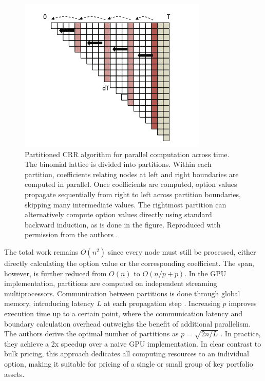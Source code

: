 \documentclass[english,12pt,a4paper,pdftex,sci,utf8]{aaltothesis}
\begin{document}
\begin{figure}[h]
    \centering
    \includegraphics[scale=0.6]{External Images/CRRpartitioned.png}
    \caption{Partitioned CRR algorithm for parallel computation across time. The binomial lattice is divided into partitions. Within each partition, coefficients relating nodes at left and right boundaries are computed in parallel. Once coefficients are computed, option values propagate sequentially from right to left across partition boundaries, skipping many intermediate values. The rightmost partition can alternatively compute option values directly using standard backward induction, as is done in the figure. Reproduced with permission from the authors \cite{ganesan2009acceleration}.}

    \label{fig:partitioned}
\end{figure}

The total work remains $O(n^2)$ since every node must still be processed, either directly calculating the option value or the corresponding coefficient. The span, however, is further reduced from $O(n)$ to $O(n/p + p)$. In the GPU implementation, partitions are computed on independent streaming multiprocessors. Communication between partitions is done through global memory, introducing latency $L$ at each propagation step \cite{ganesan2009acceleration}. Increasing $p$ improves execution time up to a certain point, where the communication latency and boundary calculation overhead outweighs the benefit of additional parallelism. The authors derive the optimal number of partitions as $p = \sqrt{2n/L}$ \cite{ganesan2009acceleration}. In practice, they achieve a 2x speedup over a naive GPU implementation. In clear contrast to bulk pricing, this approach dedicates all computing resources to an individual option, making it suitable for pricing of a single or small group of key portfolio assets.
\end{document}

